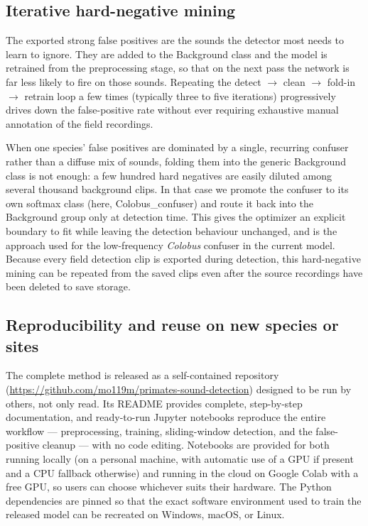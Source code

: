 \documentclass[final,3p,times]{elsarticle}
\begin{document}
\subsection*{Iterative hard-negative mining}

The exported strong false positives are the sounds the detector most needs to
learn to ignore. They are added to the Background class and the model is
retrained from the preprocessing stage, so that on the next pass the network
is far less likely to fire on those sounds. Repeating the detect $\rightarrow$
clean $\rightarrow$ fold-in $\rightarrow$ retrain loop a few times (typically
three to five iterations) progressively drives down the false-positive rate
without ever requiring exhaustive manual annotation of the field recordings.

When one species' false positives are dominated by a single, recurring
confuser rather than a diffuse mix of sounds, folding them into the generic
Background class is not enough: a few hundred hard negatives are easily diluted
among several thousand background clips. In that case we promote the confuser
to its own softmax class (here, Colobus\_confuser) and route it back
into the Background group only at detection time. This gives the optimizer an
explicit boundary to fit while leaving the detection behaviour unchanged, and
is the approach used for the low-frequency \textit{Colobus} confuser in the
current model. Because every field detection clip is exported during detection,
this hard-negative mining can be repeated from the saved clips even after the
source recordings have been deleted to save storage.

\subsection*{Reproducibility and reuse on new species or sites}

The complete method is released as a self-contained repository
(\url{https://github.com/mo119m/primates-sound-detection}) designed to be run by
others, not only read. Its README provides complete, step-by-step documentation,
and ready-to-run Jupyter notebooks reproduce the entire workflow --- preprocessing,
training, sliding-window detection, and the false-positive cleanup
--- with no code editing. Notebooks are provided for both running
locally (on a personal machine, with automatic use of a GPU if present and a
CPU fallback otherwise) and running in the cloud on Google Colab with a free
GPU, so users can choose whichever suits their hardware. The Python dependencies
are pinned so that the exact software environment used to train the released
model can be recreated on Windows, macOS, or Linux.
\end{document}
